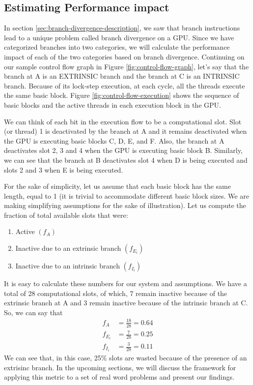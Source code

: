 \subsection*{Estimating Performance impact}
\par{In section \ref{sec:branch-divergence-description}, we saw that branch instructions lead to a unique problem called branch divergence on a GPU. Since we have categorized branches into two categories, we will calculate the performance impact of each of the two categories based on branch divergence. Continuing on our sample control flow graph in Figure \ref{fig:control-flow-graph}, let's say that the branch at A is an EXTRINSIC branch and the branch at C is an INTRINSIC branch. Because of its lock-step execution, at each cycle, all the threads execute the same basic block. Figure \ref{fig:control-flow-execution} shows the sequence of basic blocks and the active threads in each execution block in the GPU.}
\par{We can think of each bit in the execution flow to be a computational slot. Slot (or thread) 1 is deactivated by the branch at A and it remains deactivated when the GPU is executing basic blocks C, D, E, and F. Also, the branch at A deactivates slot 2, 3 and 4 when the GPU is executing basic block B. Similarly, we can see that the branch at B deactivates slot 4 when D is being executed and slots 2 and 3 when E is being executed.
}
\par{For the sake of simplicity, let us assume that each basic block has the same length, equal to 1 (it is trivial to accommodate different basic block sizes. We are making simplifying assumptions for the sake of illustration). Let us compute the fraction of total available slots that were:}
\begin{enumerate}
	\item Active $(f_{A})$
	\item Inactive due to an extrinsic branch $(f_{E_i})$
	\item Inactive due to an intrinsic branch $(f_{I_i})$
\end{enumerate}
\par{It is easy to calculate these numbers for our system and assumptions. We have a total of 28 computational slots, of which, 7 remain inactive because of the extrinsic branch at A and 3 remain inactive because of the intrinsic branch at C. So, we can say that}
\begin{align*}
	f_{A} 		&= \frac{18}{28} 	= 0.64 \\
	f_{E_{i}} 	&= \frac{7}{28} 	= 0.25 \\
	f_{I_{i}} 	&= \frac{3}{28} 	= 0.11
\end{align*}
We can see that, in this case, 25\% slots are wasted because of the presence of an extrisinc branch. In the upcoming sections, we will discuss the framework for applying this metric to a set of real word problems and present our findings.
